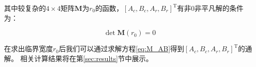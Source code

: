 其中较复杂的$4\times4$矩阵$\pmb{M}$为$r_0$的函数，$\left[A_c,B_c,A_r,B_r\right]^{\mathrm{T}}$有非$0$非平凡解的条件为：

\begin{equation}
    \det \pmb{M}(r_0) = 0
\end{equation}

在求出临界宽度$r_0$后我们可以通过求解方程\ref{eq:M_AB}得到$\left[A_c,B_c,A_r,B_r\right]^{\mathrm{T}}$的通解。
相关计算结果将在第\ref{sec:results}节中展示。
